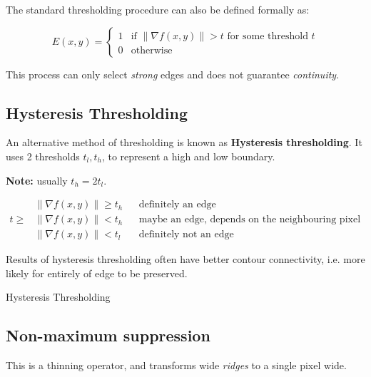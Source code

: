 \documentclass{article}
\begin{document}
The standard thresholding procedure can also be defined formally as:

\[
  E(x,y) = \begin{cases}
    1 & \text{if } \| \nabla f(x,y) \| > t \text{ for some threshold } t\\
    0 & \text{otherwise}
  \end{cases}
\]

This process can only select \textit{strong} edges and does not guarantee \textit{continuity}.

\subsection{Hysteresis Thresholding}

An alternative method of thresholding is known as \textbf{Hysteresis thresholding}. It uses 2 thresholds $t_{l},t_{h}$, to represent a high and low boundary.

\textbf{Note:} usually $t_{h} = 2t_{l}$.

\begin{align*}
  & \|\nabla f(x,y) \| \geq t_{h} && \text{definitely an edge} \\
  t \geq & \| \nabla f(x,y) \| < t_{h} && \text{maybe an edge, depends on the neighbouring pixel classifications} \\
  & \| \nabla f(x,y) \| < t_{l} && \text{definitely not an edge}
\end{align*}

Results of hysteresis thresholding often have better contour connectivity, i.e. more likely for entirely of edge to be preserved.

\begin{algorithm}
  \caption{Hysteresis Thresholding}
\end{algorithm}

\subsection{Non-maximum suppression}



This is a thinning operator, and transforms wide \textit{ridges} to a single pixel wide.
\end{document}
